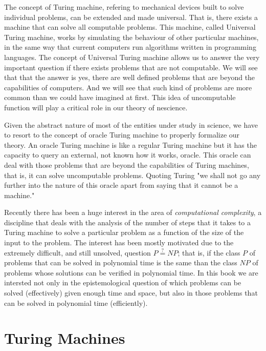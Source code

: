 The concept of Turing machine, refering to mechanical devices built to solve individual problems, can be extended and made universal. That is, there exists a machine that can solve all computable problems. This machine, called Universal Turing machine, works by simulating the behaviour of other particular machines, in the same way that current computers run algorithms written in programming languages. The concept of Universal Turing machine allows us to answer the very important question if there exists problems that are not computable. We will see that that the answer is yes, there are well defined problems that are beyond the capabilities of computers. And we will see that such kind of problems are more common than we could have imagined at first. This idea of uncomputable function will play a critical role in our theory of nescience.

Given the abstract nature of most of the entities under study in science, we have to resort to the concept of oracle Turing machine to properly formalize our theory. An oracle Turing machine is like a regular Turing machine but it has the capacity to query an external, not known how it works, oracle. This oracle can deal with those problems that are beyond the capabilities of Turing machines, that is, it can solve uncomputable problems. Quoting Turing "we shall not go any further into the nature of this oracle apart from saying that it cannot be a machine."

Recently there has been a huge interest in the area of \emph{computational complexity}, a discipline that deals with the analysis of the number of steps that it takes to a Turing machine to solve a particular problem as a function of the size of the input to the problem. The interest has been mostly motivated due to the extremely difficult, and still unsolved, question $P\overset{?}{=}NP$; that is, if the class $P$ of problems that can be solved in polynomial time is the same than the class $NP$ of problems whose solutions can be verified in polynomial time. In this book we are intersted not only in the epistemological question of which problems can be solved (effectively) given enough time and space, but also in those problems that can be solved in polynomial time (efficiently). 

%
%

\section{Turing Machines}
\label{sec:Turing-Machines}

